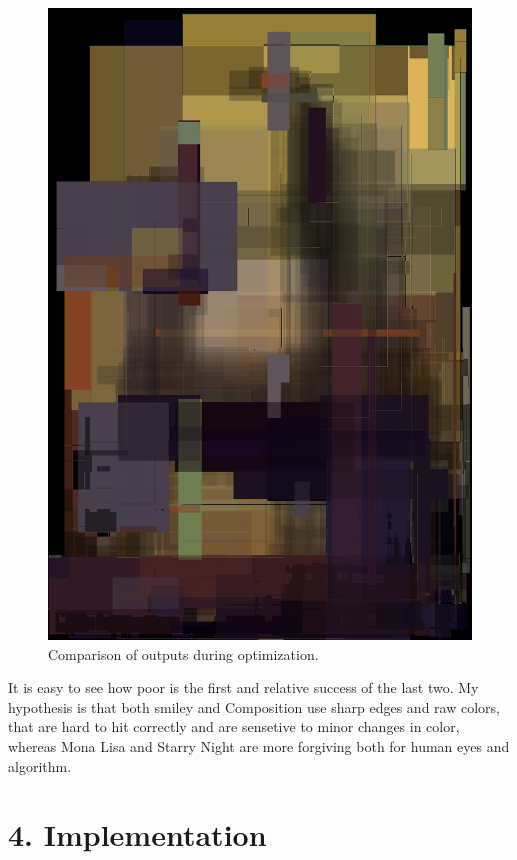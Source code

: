 \documentclass[a4paper,twocolumn]{article}
\begin{document}
\begin{figure}[h!]
\begin{minipage}[t]{0.08\textwidth}
                \includegraphics[width=\linewidth]{approx/davinci_monalisa.png}
        \end{minipage}
        \caption{Comparison of outputs during optimization.}
        \label{fig:sidebyside}
\end{figure}

It is easy to see how poor is the first and relative success of the last two. My hypothesis is that both smiley and Composition use sharp edges and raw colors, that are hard to hit correctly and are sensetive to minor changes in color, whereas Mona Lisa and Starry Night are more forgiving both for human eyes and algorithm.

\section*{4. Implementation}
\end{document}
